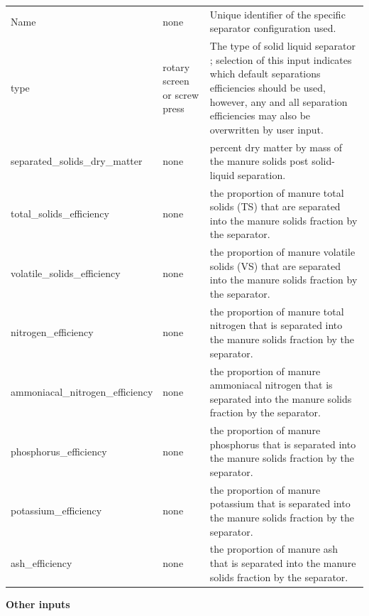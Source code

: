 \begin{refsection}
\begin{longtable}{@{} L{4.5cm} L{2cm} L{8cm} @{}}
\bottomrule
\endfoot
 Name & none &  Unique identifier of the specific separator configuration used. \\ 
type & rotary screen or screw press &  The type of solid liquid separator ; selection of this input indicates which default separations efficiencies should be used, however, any and all separation efficiencies may also be overwritten by user input. \\ 
separated\_solids\_dry\_matter & none &  percent dry matter by mass of the manure solids post solid-liquid separation. \\ 
total\_solids\_efficiency & none &  the proportion of manure total solids (TS) that are separated into the manure solids fraction by the separator. \\ 
 volatile\_solids\_efficiency & none &  the proportion of manure volatile solids (VS) that are separated into the manure solids fraction by the separator. \\ 
 nitrogen\_efficiency & none &  the proportion of manure total nitrogen that is separated into the manure solids fraction by the separator. \\ 
 ammoniacal\_nitrogen\_efficiency & none &  the proportion of manure ammoniacal nitrogen that is separated into the manure solids fraction by the separator. \\ 
 phosphorus\_efficiency & none &  the proportion of manure phosphorus that is separated into the manure solids fraction by the separator. \\ 
 potassium\_efficiency & none &  the proportion of manure potassium that is separated into the manure solids fraction by the separator. \\ 
 ash\_efficiency & none &  the proportion of manure ash that is separated into the manure solids fraction by the separator. \\ 

    \end{longtable}  
    \vspace{0.5cm}
    
\textbf{Other inputs}
    \vspace{ 0.25cm}


\end{refsection}

